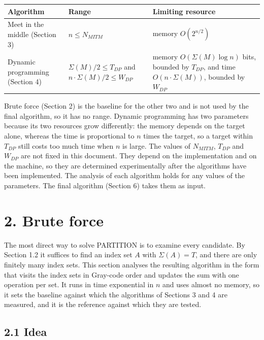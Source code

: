\documentclass[
]{article}
\begin{document}
\begin{longtable}[]{@{}>{\raggedright\arraybackslash}p{}>{\raggedright\arraybackslash}p{}>{\raggedright\arraybackslash}p{}@{}}
\toprule
Algorithm & Range & Limiting resource \\
\midrule
\endhead
Meet in the middle (Section 3) & \(n \le N_{MITM}\) & memory \(O(2^{n/2})\) \\
\midrule
Dynamic programming (Section 4) & \(\Sigma(M)/2 \le T_{DP}\) and \(n \cdot \Sigma(M)/2 \le W_{DP}\) & memory \(O(\Sigma(M) \log n)\) bits, bounded by \(T_{DP}\), and time
\(O(n \cdot \Sigma(M))\), bounded by \(W_{DP}\) \\
\bottomrule
\end{longtable}

Brute force (Section 2) is the baseline for the other two and is not
used by the final algorithm, so it has no range. Dynamic programming has
two parameters because its two resources grow differently: the memory
depends on the target alone, whereas the time is proportional to \(n\)
times the target, so a target within \(T_{DP}\) still costs too much
time when \(n\) is large. The values of \(N_{MITM}\), \(T_{DP}\) and
\(W_{DP}\) are not fixed in this document. They depend on the
implementation and on the machine, so they are determined experimentally
after the algorithms have been implemented. The analysis of each
algorithm holds for any values of the parameters. The final algorithm
(Section 6) takes them as input.

\hypertarget{brute-force}{%
\section{2. Brute force}\label{brute-force}}

The most direct way to solve PARTITION is to examine every candidate. By
Section 1.2 it suffices to find an index set \(A\) with
\(\Sigma(A) = T\), and there are only finitely many index sets. This
section analyses the resulting algorithm in the form that visits the
index sets in Gray-code order and updates the sum with one operation per
set. It runs in time exponential in \(n\) and uses almost no memory, so
it sets the baseline against which the algorithms of Sections 3 and 4
are measured, and it is the reference against which they are tested.

\hypertarget{idea}{%
\subsection{2.1 Idea}\label{idea}}
\end{document}

